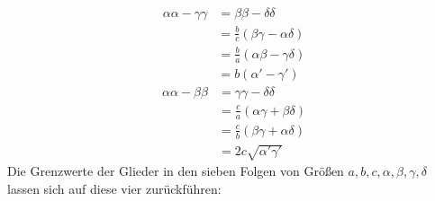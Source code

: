 \[
\begin{aligned}\alpha\alpha-\gamma\gamma&=\beta\beta-\delta\delta
\\&=\frac bc(\beta\gamma-\alpha\delta)\\&=\frac ba(\alpha\beta-\gamma\delta)
\\&=b(\alpha'-\gamma')\end{aligned}
\]
\[
\begin{aligned}\alpha\alpha-\beta\beta&=\gamma\gamma-\delta\delta
\\&=\frac ca(\alpha\gamma+\beta\delta)\\&=\frac cb(\beta\gamma+\alpha\delta)
\\&=2c\surd{\alpha'\gamma'}\end{aligned}
\]
Die Grenzwerte der Glieder in den sieben Folgen von Größen $a,\allowbreak b,\allowbreak c,\allowbreak \alpha,\allowbreak \beta,\allowbreak \gamma,\allowbreak \delta$ lassen sich auf diese vier zurückführen:

